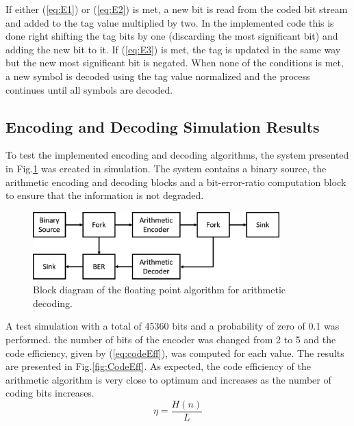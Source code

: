 \begin{refsection}
If either (\ref{eq:E1}) or (\ref{eq:E2}) is met, a new bit is read from the coded bit stream and added to the tag value multiplied by two. In the implemented code this is done right shifting the tag bits by one (discarding the most significant bit) and adding the new bit to it. If (\ref{eq:E3}) is met, the tag is updated in the same way but the new most significant bit is negated. When none of the conditions is met, a new symbol is decoded using the tag value normalized and the process continues until all symbols are decoded.


\subsection{Encoding and Decoding Simulation Results}

To test the implemented encoding and decoding algorithms, the system presented in Fig.\ref{fig:SystemBlockDiagr} was created in simulation. The system contains a binary source, the arithmetic encoding and decoding blocks and a bit-error-ratio computation block to ensure that the information is not degraded.

\begin{figure}[h]
	\centering
	\includegraphics[width=0.85\textwidth]{./sdf/eit_46084_arithmetic_encoder_decoder/figures/TestSystemBlockDiagram.png}
	\caption{Block diagram of the floating point algorithm for arithmetic decoding.}\label{fig:SystemBlockDiagr}
\end{figure}

A test simulation with a total of 45360 bits and a probability of zero of 0.1 was performed. the number of bits of the encoder was changed from 2 to 5 and the code efficiency, given by (\ref{eq:codeEff}), was computed for each value. The results are presented in Fig.\ref{fig:CodeEff}. As expected, the code efficiency of the arithmetic algorithm is very close to optimum and increases as the number of coding bits increases.
\begin{equation} \label{eq:codeEff}
\eta = \frac{H(n)}{L}
\end{equation}


\end{refsection}
